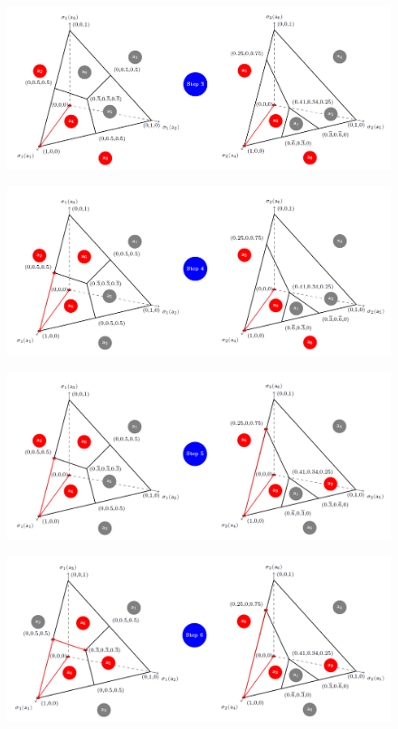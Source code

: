 \begin{figure}[H]
\centering
\includegraphics[width=\textwidth]{images/img_2_13_06.png}
\end{figure}
\begin{figure}[H]
\centering
\includegraphics[width=\textwidth]{images/img_2_13_07.png}
\end{figure}
\begin{figure}[H]
\centering
\includegraphics[width=\textwidth]{images/img_2_13_08.png}
\end{figure}
\begin{figure}[H]
\centering
\includegraphics[width=\textwidth]{images/img_2_13_09.png}
\end{figure}
